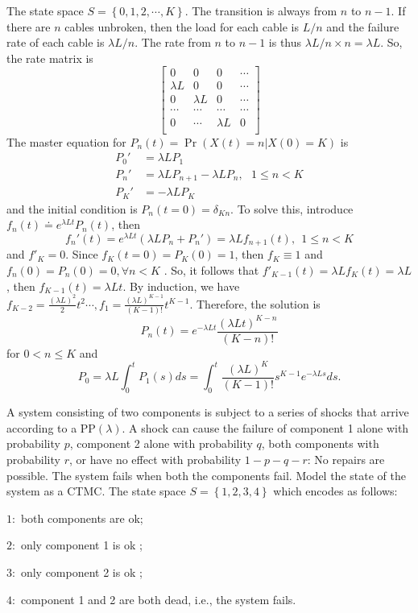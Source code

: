 \documentclass[  11pt]{article}
\newcommand{\p}{ {\Pr}}
\newcommand{\PP}{\mbox{PP}}
\newcommand{\set}[1]{\left\{#1\right\}}
\begin{document}
\begin{ExerciseList}
 
\Answer
 The state space $S=\set{0,1,2,\cdots,K}$. The transition is always from $n$ to $n-1$.
 If there are $n$ cables unbroken, then the load for each cable is 
 $L/n$ and the failure rate of each cable is $\lambda L / n$.
 The rate from $n$ to $n-1$ is thus $\lambda L/  n \times n =\lambda L$.
 So, the rate matrix is 
 \[\begin{bmatrix}
 0 & 0 & 0& \cdots \\
 \lambda L & 0 & 0 & \cdots \\
 0 & \lambda L & 0  & \cdots \\
 \cdots &\cdots&\cdots&\cdots\\
 0  & \cdots & \lambda L &0 \\
 \end{bmatrix}
 \]
The master equation for $P_n(t) = \p( X(t)=n \vert X(0)=K)$ is
\[
\begin{split}
 P_0' &= \lambda L P_1 
 \\
 P_n'   &= \lambda L P_{n+1}  - \lambda L P_n, ~~~ 1\leq n <K
 \\
 P_K' &= -\lambda L P_K
 \end{split}
 \]
and the initial condition is 
$P_n(t=0) = \delta_{Kn}.$
To solve this, introduce  $f_n(t) \doteq e^{\lambda L t}P_n(t) $, then 
$$f_n' (t)= e^{\lambda Lt } (\lambda L P_n + P_n')=  \lambda L f_{n+1}(t),~~1\leq n <K$$
and   $f'_K=0$. Since $f_K(t=0)=P_K(0)=1$, then
$f_K\equiv 1$ and $f_{n}(0)=P_n(0)=0,\forall n<K$ . So, it follows that 
$f'_{K-1}(t)=\lambda L f_{K}(t)=\lambda L$, then
$f_{K-1}(t) = \lambda  L t $. By induction, we have  $f_{K-2}=\frac{(\lambda  L)^2}{2}{t^2}
\cdots, f_{1}=\frac{(\lambda L)^{K-1}}{(K-1)!}t^{K-1}$.
Therefore, the solution is 
$$P_n(t) = e^{-\lambda L t } \frac{ (\lambda L t )^{K-n}}{(K-n)!}$$
for $0<n\leq K$
and $$P_0= \lambda L \int_0^t P_1(s)ds
=  \int_0^t\frac{(\lambda L)^{K}}{(K-1)!}s^{K-1} e^{-\lambda L s}ds.$$


\Exercise[origin={4.6, p 139}]\label{cable}
 A system consisting of two components is subject to a series of shocks that arrive according to a
$\PP(\lambda)$. A shock can cause the failure of component 1 alone with probability $p$, component 2 alone with probability $q$, both components with probability $r$, or have no effect with probability 
$1-p-q-r$: No repairs are possible. The system fails when both the components fail. Model the state of the system as a CTMC.
\Answer
The state space  $S=\set{1,2,3,4}$ which encodes as follows: \par
$1:$ both components are ok;\par
$2:$ only component 1 is ok ;\par
$3:$ only component 2 is ok ;\par
$4:$ component 1 and 2 are both dead, i.e., the system fails. \par


\end{ExerciseList}
\end{document}
